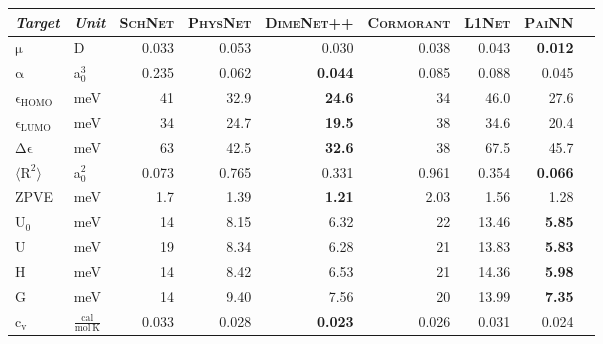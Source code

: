 \documentclass[reprint,
amsmath,amssymb,
 aip,jcp
]{revtex4-2}
\newcommand{\painn}{\textsc{PaiNN}}
\begin{document}
\begin{table*}[tb]
\caption{Mean absolute errors on QM9 dataset for various chemical properties. Results for \painn{} are averaged over three random splits. Best in \textbf{bold}.}
\label{tab:qm9}
\begin{center}
\begin{small}
\begin{tabular}{llrrrrrrr}
\toprule
\textit{Target} & \textit{Unit} & \textsc{\textbf{SchNet}} & \textsc{\textbf{PhysNet}} & \textsc{\textbf{DimeNet++}} & \textsc{\textbf{Cormorant}} & \textsc{\textbf{L1Net}} & \textsc{\textbf{\painn{}}} \\ \midrule
$\mathrm{\mu}$ & D & 0.033 & 0.053 & 0.030 & 0.038 & 0.043 & \textbf{0.012}\\
$\mathrm{\alpha}$ & a$_0^3$ &  0.235  & 0.062 & \textbf{0.044}  & 0.085 & 0.088 & 0.045 \\
$\mathrm{\epsilon}_\text{HOMO}$ & meV & 41 & 32.9 & \textbf{24.6}  & 34 & 46.0 & 27.6 \\
$\mathrm{\epsilon}_\text{LUMO}$ & meV & 34 & 24.7 & \textbf{19.5}  & 38 & 34.6 & 20.4 \\
$\mathrm{\Delta \epsilon}$ & meV & 63 & 42.5 & \textbf{32.6} & 38 & 67.5 &  45.7 \\
$\mathrm{\langle R^2 \rangle}$ & a$_0^2$ & 0.073 & 0.765 & 0.331 & 0.961 & 0.354 & \textbf{0.066} \\
ZPVE & meV & 1.7 & 1.39 & \textbf{1.21} & 2.03 & 1.56 & 1.28 \\
U$_0$ & meV & 14 & 8.15 & 6.32 & 22 & 13.46  & \textbf{5.85} \\
U & meV & 19 & 8.34 & 6.28 & 21 & 13.83  & \textbf{5.83} \\
H & meV & 14 & 8.42 & 6.53 & 21 & 14.36  & \textbf{5.98} \\
G & meV & 14 & 9.40 & 7.56 & 20 & 13.99  & \textbf{7.35} \\
c$_\text{v}$ & $\mathrm{\frac{cal}{mol \, K}}$ & 0.033 & 0.028 & \textbf{0.023} & 0.026 & 0.031 & 0.024 \\
\bottomrule
\end{tabular}
\end{small}
\end{center}
\vskip -0.1in
\end{table*}
\end{document}
